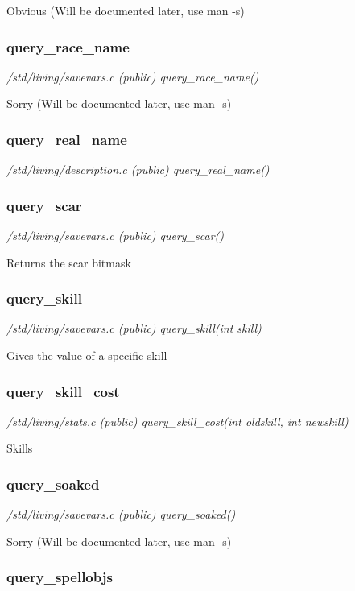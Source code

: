 Obvious (Will be documented later, use man -s)


\subsubsection{query\_race\_name}

{\em /std/living/savevars.c (public) query\_race\_name()}

Sorry (Will be documented later, use man -s)


\subsubsection{query\_real\_name}

{\em /std/living/description.c (public) query\_real\_name()}



\subsubsection{query\_scar}

{\em /std/living/savevars.c (public) query\_scar()}

Returns the scar bitmask


\subsubsection{query\_skill}

{\em /std/living/savevars.c (public) query\_skill(int skill)}

Gives the value of a specific skill


\subsubsection{query\_skill\_cost}

{\em /std/living/stats.c (public) query\_skill\_cost(int oldskill, int newskill)}

Skills


\subsubsection{query\_soaked}

{\em /std/living/savevars.c (public) query\_soaked()}

Sorry (Will be documented later, use man -s)


\subsubsection{query\_spellobjs}


